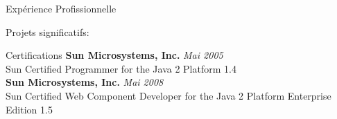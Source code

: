 \documentclass{resume}
\begin{document}
\begin{rSection}{Expérience Profissionnelle}
\begin{rSubsection}{Projets significatifs:}{}{}{}
    \end{rSubsection}
  \end{rSection}

  \begin{rSection}{Certifications}
    {\bf Sun Microsystems, Inc.} \hfill {\em Mai 2005} \\ 
    {Sun Certified Programmer for the Java 2 Platform 1.4} \\

    {\bf Sun Microsystems, Inc.} \hfill {\em Mai 2008} \\ 
    {Sun Certified Web Component Developer for the Java 2 Platform Enterprise Edition 1.5} \\
  \end{rSection}
  
\end{document}
